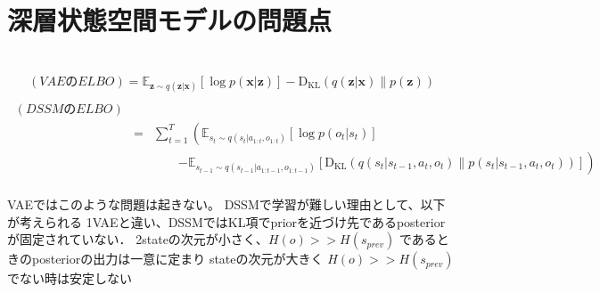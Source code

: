 \section{深層状態空間モデルの問題点}
\begin{eqnarray}
  \end{eqnarray}
  
\begin{eqnarray}
    (VAEのELBO) \nonumber = \mathbb{E}_{\bm{z} \sim q(\bm{z}|\bm{x})} [\log p(\bm{x}|\bm{z})] - \mathrm{D_{KL}}(q(\bm{z}|\bm{x}) \| p(\bm{z})) \label{eq:vae_elbo2} \\
\end{eqnarray}
\begin{eqnarray}
    \ (DSSMのELBO) \nonumber \\
    &=& \sum_{t=1}^T \left( \mathbb{E}_{s_t \sim q(s_t|a_{1:t}, o_{1:t})} [\log p(o_t|s_t)] \right. \nonumber \\
    && \hspace{2em} \left. - \mathbb{E}_{s_{t-1} \sim q(s_{t-1}|a_{1:t-1}, o_{1:t-1})} [\mathrm{D_{KL}}(q(s_t|s_{t-1}, a_t, o_t) \| p(s_t|s_{t-1}, a_t, o_t))] \right)  \nonumber \\
    \label{eq:dssm_elbo2}
  \end{eqnarray}

VAEではこのような問題は起きない。
DSSMで学習が難しい理由として、以下が考えられる
1VAEと違い、DSSMではKL項でpriorを近づけ先であるposteriorが固定されていない．
2stateの次元が小さく、$H(o) >> H(s_{prev})$ であるときのposteriorの出力は一意に定まり
stateの次元が大きく $H(o) >> H(s_{prev})$でない時は安定しない

